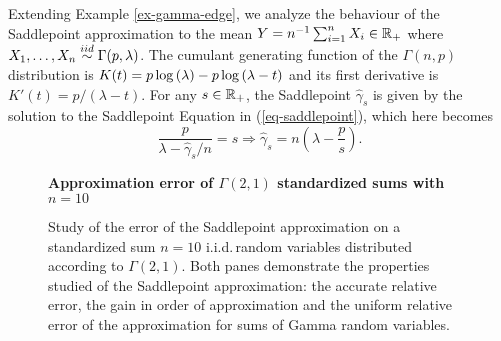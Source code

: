 \begin{example} \label{ex-gamma-saddle}
    Extending Example \ref{ex-gamma-edge}, we analyze the behaviour of the Saddlepoint approximation to the mean $Y = n^{-1}\sum_{i=1}^n X_i \in \mathbb{R}_+$ where $X_1, \ldots, X_n \stackrel{iid}{\sim} \Gamma(p, \lambda)$. The cumulant generating function of the $\Gamma(n, p)$ distribution is $K(t) = p\log\left(\lambda\right) - p\log\left(\lambda - t\right)$ and its first derivative is $K'(t) = p / (\lambda - t)$. For any $s \in \mathbb{R}_+$, the Saddlepoint $\hat\gamma_s$ is given by the solution to the Saddlepoint Equation in (\ref{eq-saddlepoint}), which here becomes
    \begin{equation*}
        \frac{p}{\lambda - \hat\gamma_s/n} = s \Rightarrow \hat\gamma_s = n\left(\lambda - \frac{p}{s}\right).
    \end{equation*}

    \begin{figure}[!htbp]
        \textbf{Approximation error of $\Gamma(2,1)$ standardized sums with $n=10$}
        \centering
        \caption{Study of the error of the Saddlepoint approximation on a standardized sum $n=10$ i.i.d.\,random variables distributed according to $\Gamma(2, 1)$. Both panes demonstrate the properties studied of the Saddlepoint approximation: the accurate relative error, the gain in order of approximation and the uniform relative error of the approximation for sums of Gamma random variables.}
        \label{fig-saddlepoint-err}
    \end{figure}


\end{example}
